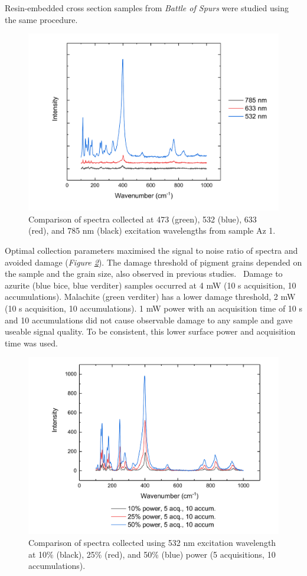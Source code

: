 Resin-embedded cross section samples from \textit{Battle of Spurs} were studied using the same procedure.

\begin{figure}[H]
\centering
  \includegraphics[width=0.75\linewidth]{Az1_wavelength_comparison}
\caption[Comparison of spectra collected at 473, 532, 633, and 785 nm excitation wavelengths from sample Az 1.]{Comparison of spectra collected at 473 (green), 532 (blue), 633 (red), and 785 nm (black) excitation wavelengths from sample Az 1.}
\label{fig:Az1_wavelength_comparison}
\end{figure}

Optimal collection parameters maximised the signal to noise ratio of spectra and avoided damage (\textit{Figure \ref{fig:Az1_laserpower_comp_532}}). The damage threshold of pigment grains depended on the sample and the grain size, also observed in previous studies.~\autocite{Cardell,Mattei} Damage to azurite (blue bice, blue verditer) samples occurred at 4 mW (10 s acquisition, 10 accumulations). Malachite (green verditer) has a lower damage threshold, 2 mW (10 s acquisition, 10 accumulations). 1 mW power with an acquisition time of 10 s and 10 accumulations did not cause observable damage to any sample and gave useable signal quality. To be consistent, this lower surface power and acquisition time was used. 

\begin{figure}[H]
\centering
  \includegraphics[width=0.75\linewidth]{Az1_laserpower_comp_532}
\caption[Comparison of spectra collected using 532 nm excitation wavelength at 10\%, 25\%, and 50\% power.]{Comparison of spectra collected using 532 nm excitation wavelength at 10\% (black), 25\% (red), and 50\% (blue) power (5 acquisitions, 10 accumulations).}
\label{fig:Az1_laserpower_comp_532}
\end{figure}


